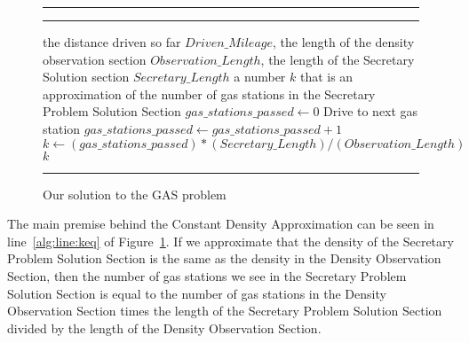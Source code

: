 \begin{figure}[!hbt]
\vspace{0.2cm}
\hrule \medskip {} \smallskip
\hrule
\smallskip
\begin{algorithmic}[1]
 the distance driven so far $Driven\_Mileage$, the length of the density observation section $Observation\_Length$, the length of the Secretary Solution section $Secretary\_Length$
 a number $k$ that is an approximation of the number of gas stations in the Secretary Problem Solution Section
$gas\_stations\_passed \gets 0$
\STATE Drive to next gas station
\STATE $gas\_stations\_passed \gets gas\_stations\_passed + 1$
\ENDWHILE \\
\STATE $k \gets (gas\_stations\_passed) * (Secretary\_Length) / (Observation\_Length)$ \label{alg:line:keq}
\RETURN $k$
\end{algorithmic}
\hrule
\caption{Our solution to the GAS problem}
\label{fig:tcp-est}
\end{figure}

The main premise behind the Constant Density Approximation can be seen in line~\ref{alg:line:keq} of Figure~\ref{fig:tcp-est}. If we approximate that the density of the Secretary Problem Solution Section is the same as the density in the Density Observation Section, then the number of gas stations we see in the Secretary Problem Solution Section is equal to the number of gas stations in the Density Observation Section times the length of the Secretary Problem Solution Section divided by the length of the Density Observation Section.
